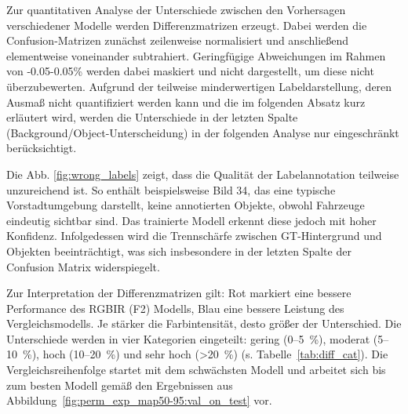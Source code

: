 Zur quantitativen Analyse der Unterschiede zwischen den Vorhersagen verschiedener Modelle werden Differenzmatrizen erzeugt. Dabei werden die Confusion-Matrizen zunächst zeilenweise normalisiert und anschließend elementweise voneinander subtrahiert. Geringfügige Abweichungen im Rahmen von -0.05-0.05\% werden dabei maskiert und nicht dargestellt, um diese nicht überzubewerten. Aufgrund der teilweise minderwertigen Labeldarstellung, deren Ausmaß nicht quantifiziert werden kann und die im folgenden Absatz kurz erläutert wird, werden die Unterschiede in der letzten Spalte (Background/Object-Unterscheidung) in der folgenden Analyse nur eingeschränkt berücksichtigt.

Die Abb. \ref{fig:wrong_labels} zeigt, dass die Qualität der Labelannotation teilweise unzureichend ist. So enthält beispielsweise Bild 34, das eine typische Vorstadtumgebung darstellt, keine annotierten Objekte, obwohl Fahrzeuge eindeutig sichtbar sind. Das trainierte Modell erkennt diese jedoch mit hoher Konfidenz. Infolgedessen wird die Trennschärfe zwischen \acrshort{GT}-Hintergrund und Objekten beeinträchtigt, was sich insbesondere in der letzten Spalte der Confusion Matrix widerspiegelt.


Zur Interpretation der Differenzmatrizen gilt: Rot markiert eine bessere Performance des RGBIR (F2) Modells, Blau eine bessere Leistung des Vergleichsmodells. Je stärker die Farbintensität, desto größer der Unterschied. Die Unterschiede werden in vier Kategorien eingeteilt: gering (0–5~\%), moderat (5–10~\%), hoch (10–20~\%) und sehr hoch (>20~\%) (s. Tabelle~\ref{tab:diff_cat}). Die Vergleichsreihenfolge startet mit dem schwächsten Modell und arbeitet sich bis zum besten Modell gemäß den Ergebnissen aus Abbildung~\ref{fig:perm_exp_map50-95:val_on_test} vor.


